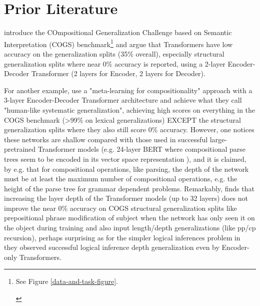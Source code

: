 \documentclass[11pt]{article}
\begin{document}
\section{Prior Literature}

\cite{KimLinzen2020} introduce the COmpositional Generalization Challenge based on Semantic Interpretation (COGS) benchmark\footnote{
\begin{footnotesize}See Figure \ref{data-and-task-figure}.
\end{footnotesize}
} and argue that Transformers have low accuracy on the generalization splits (35\% overall), especially structural generalization splits where near 0\% accuracy is reported, using a 2-layer Encoder-Decoder Transformer (2 layers for Encoder, 2 layers for Decoder). 

For another example, \cite{lake2023human} use a "meta-learning for compositionality" approach with a 3-layer Encoder-Decoder Transformer architecture and achieve what they call "human-like systematic generalization", achieving high scores on everything in the COGS benchmark (>99\% on lexical generalizations) EXCEPT the structural generalization splits where they also still score 0\% accuracy.
However, one notices these networks are shallow compared with those used in successful large-pretrained Transformer models (e.g. 24-layer BERT where compositional parse trees seem to be encoded in its vector space representation \cite{hewitt-manning-2019-structural}), and it is claimed, by e.g. \cite{Csordas2022} that for compositional operations, like parsing, the depth of the network must be at least the maximum number of compositional operations, e.g. the height of the parse tree for grammar dependent problems. Remarkably, \cite{petty2024impactdepthcompositionalgeneralization} finds that increasing the layer depth of the Transformer models (up to 32 layers) does not improve the near 0\% accuracy on COGS structural generalization splits like prepositional phrase modification of subject when the network has only seen it on the object during training and also input length/depth generalizations (like pp/cp recursion), perhaps surprising as for the simpler logical inferences problem in \cite{Clark2020} they observed successful logical inference depth generalization even by Encoder-only Transformers.
\end{document}
